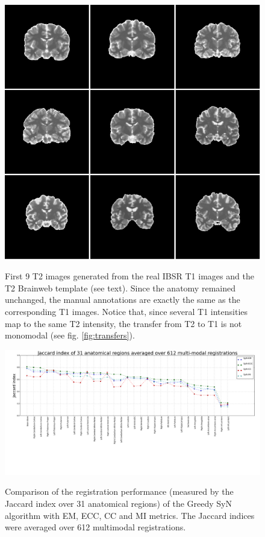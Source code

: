 \begin{figure}[H]
\centering
\includegraphics[width=1.0\linewidth]{./images/semi_synthetic.png}\\
\caption{First 9 T2 images generated from the real IBSR T1 images and the T2 Brainweb template (see text). Since the anatomy remained unchanged, the manual annotations are exactly
the same as the corresponding T1 images. Notice that, since several T1 intensities map to the same T2 intensity, the transfer from T2 to T1 is not monomodal
(see fig. \ref{fig:transfers}).}
\label{fig:semi_synthetic}
\end{figure}




\begin{figure}[H]
\centering
\includegraphics[width=1.0\linewidth]{./images/multi_lines_seg.png}\\
\caption{Comparison of the registration performance (measured by the Jaccard index over 31 anatomical regions) of the Greedy SyN algorithm with EM, ECC, CC and MI metrics. The Jaccard
indices were averaged over 612 multimodal registrations.}
\label{fig:multi_seg}
\end{figure}

